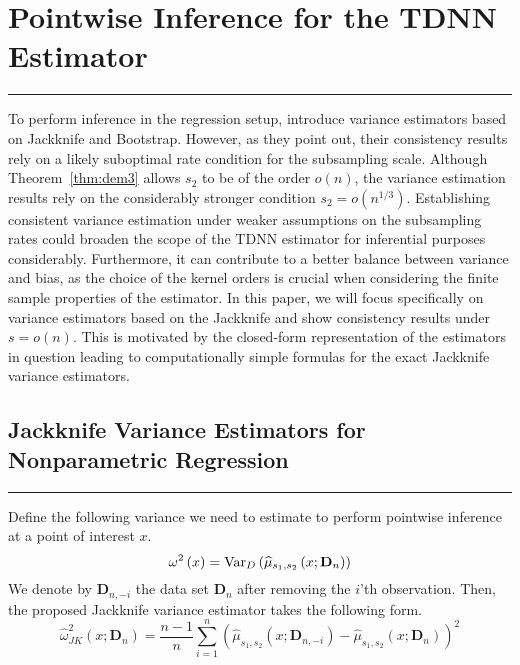 \section{Pointwise Inference for the TDNN Estimator}\label{sec:pw_inf}
\hrule
To perform inference in the regression setup, \citet{demirkaya_optimal_2024} introduce variance estimators based on Jackknife and Bootstrap.
However, as they point out, their consistency results rely on a likely suboptimal rate condition for the subsampling scale.
Although Theorem~\ref{thm:dem3} allows $s_2$ to be of the order $o(n)$, the variance estimation results rely on the considerably stronger condition $s_2 = o(n^{1/3})$.
Establishing consistent variance estimation under weaker assumptions on the subsampling rates could broaden the scope of the TDNN estimator for inferential purposes considerably.
Furthermore, it can contribute to a better balance between variance and bias, as the choice of the kernel orders is crucial when considering the finite sample properties of the estimator.
In this paper, we will focus specifically on variance estimators based on the Jackknife and show consistency results under $s = o(n)$.
This is motivated by the closed-form representation of the estimators in question leading to computationally simple formulas for the exact Jackknife variance estimators.

\subsection{Jackknife Variance Estimators for Nonparametric Regression}\label{Var_Ests}
\hrule

Define the following variance we need to estimate to perform pointwise inference at a point of interest $x$.
\begin{equation}\label{eq:TDNN_Var}
	\omega^{2}\left(x\right)
	= \text{Var}_{D}\left(\widehat{\mu}_{s_1, s_2}\left(x; \mathbf{D}_n\right)\right)
\end{equation}
We denote by $\mathbf{D}_{n, -i}$ the data set $\mathbf{D}_n$ after removing the $i$'th observation.
Then, the proposed Jackknife variance estimator takes the following form.
\begin{equation}\label{eq:JK_Var_Est}
	\hat{\omega}_{JK}^2\left(x; \mathbf{D}_n\right)
	= \frac{n-1}{n} \sum_{i = 1}^{n}\left(\hat{\mu}_{s_1, s_2}\left(x; \mathbf{D}_{n, -i}\right) - \hat{\mu}_{s_1, s_2}\left(x; \mathbf{D}_{n}\right)\right)^2
\end{equation}

